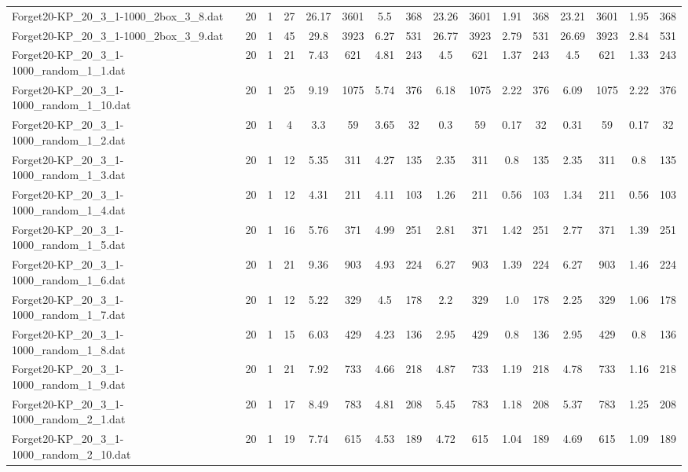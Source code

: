 \begin{sidewaystable}[!ht]
{\begin{tabular}{lccccccccccccccc}
Forget20-KP\_20\_3\_1-1000\_2box\_3\_8.dat & 20 & 1 & 27 & 26.17 & 3601 & 5.5 & 368 & 23.26 & 3601 & 1.91 & 368 & 23.21 & 3601 & 1.95 & 368 \\
Forget20-KP\_20\_3\_1-1000\_2box\_3\_9.dat & 20 & 1 & 45 & 29.8 & 3923 & 6.27 & 531 & 26.77 & 3923 & 2.79 & 531 & 26.69 & 3923 & 2.84 & 531 \\
Forget20-KP\_20\_3\_1-1000\_random\_1\_1.dat & 20 & 1 & 21 & 7.43 & 621 & 4.81 & 243 & 4.5 & 621 & 1.37 & 243 & 4.5 & 621 &  \textcolor{blue2}{1.33} & 243 \\
Forget20-KP\_20\_3\_1-1000\_random\_1\_10.dat & 20 & 1 & 25 & 9.19 & 1075 & 5.74 & 376 & 6.18 & 1075 & 2.22 & 376 & 6.09 & 1075 & 2.22 & 376 \\
Forget20-KP\_20\_3\_1-1000\_random\_1\_2.dat & 20 & 1 & 4 & 3.3 & 59 & 3.65 & 32 & 0.3 & 59 &  \textcolor{blue2}{0.17} & 32 & 0.31 & 59 &  \textcolor{blue2}{0.17} & 32 \\
Forget20-KP\_20\_3\_1-1000\_random\_1\_3.dat & 20 & 1 & 12 & 5.35 & 311 & 4.27 & 135 & 2.35 & 311 &  \textcolor{blue2}{0.8} & 135 & 2.35 & 311 &  \textcolor{blue2}{0.8} & 135 \\
Forget20-KP\_20\_3\_1-1000\_random\_1\_4.dat & 20 & 1 & 12 & 4.31 & 211 & 4.11 & 103 & 1.26 & 211 &  \textcolor{blue2}{0.56} & 103 & 1.34 & 211 &  \textcolor{blue2}{0.56} & 103 \\
Forget20-KP\_20\_3\_1-1000\_random\_1\_5.dat & 20 & 1 & 16 & 5.76 & 371 & 4.99 & 251 & 2.81 & 371 & 1.42 & 251 & 2.77 & 371 &  \textcolor{blue2}{1.39} & 251 \\
Forget20-KP\_20\_3\_1-1000\_random\_1\_6.dat & 20 & 1 & 21 & 9.36 & 903 & 4.93 & 224 & 6.27 & 903 &  \textcolor{blue2}{1.39} & 224 & 6.27 & 903 & 1.46 & 224 \\
Forget20-KP\_20\_3\_1-1000\_random\_1\_7.dat & 20 & 1 & 12 & 5.22 & 329 & 4.5 & 178 & 2.2 & 329 & 1.0 & 178 & 2.25 & 329 & 1.06 & 178 \\
Forget20-KP\_20\_3\_1-1000\_random\_1\_8.dat & 20 & 1 & 15 & 6.03 & 429 & 4.23 & 136 & 2.95 & 429 &  \textcolor{blue2}{0.8} & 136 & 2.95 & 429 &  \textcolor{blue2}{0.8} & 136 \\
Forget20-KP\_20\_3\_1-1000\_random\_1\_9.dat & 20 & 1 & 21 & 7.92 & 733 & 4.66 & 218 & 4.87 & 733 & 1.19 & 218 & 4.78 & 733 &  \textcolor{blue2}{1.16} & 218 \\
Forget20-KP\_20\_3\_1-1000\_random\_2\_1.dat & 20 & 1 & 17 & 8.49 & 783 & 4.81 & 208 & 5.45 & 783 &  \textcolor{blue2}{1.18} & 208 & 5.37 & 783 & 1.25 & 208 \\
Forget20-KP\_20\_3\_1-1000\_random\_2\_10.dat & 20 & 1 & 19 & 7.74 & 615 & 4.53 & 189 & 4.72 & 615 &  \textcolor{blue2}{1.04} & 189 & 4.69 & 615 & 1.09 & 189 \\

\end{tabular}}
\end{sidewaystable}
